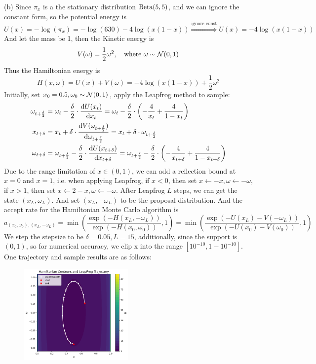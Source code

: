 \begin{homeworkProblem}
(b) Since $\pi_x$ is a the stationary distribution $\operatorname{Beta}(5,5)$, and we can ignore the constant form, so the potential energy is
$$U(x)=-\log(\pi_x) = -\log(630) -4\log(x(1-x)) \stackrel{\text{ignore const}}{\Rightarrow} U(x)=-4\log(x(1-x))$$
And let the mass be 1, then the Kinetic energy is
$$V(\omega)=\dfrac{1}{2}\omega^2, \quad\text{where } \omega\sim\mathcal{N}(0,1)$$
Thus the Hamiltonian energy is
$$H(x,\omega)=U(x)+V(\omega)=-4\log(x(1-x))+\dfrac{1}{2}\omega^2$$
Initially, set $x_0=0.5, \omega_0\sim\mathcal{N}(0,1)$, apply the Leapfrog method to sample:
\begin{align*}
\omega_{t+\frac{\delta}{2}} &= \omega_t - \frac{\delta}{2}\cdot \dfrac{\mathrm{d}U(x_t)}{\mathrm{d}x_t} = \omega_t - \frac{\delta}{2}\cdot \left(-\dfrac{4}{x_t}+\dfrac{4}{1-x_t}\right) \\
x_{t+\delta} &= x_t + \delta \cdot \dfrac{\mathrm{d}V(\omega_{t+\frac{\delta}{2}})}{\mathrm{d}\omega_{t+\frac{\delta}{2}}} = x_t + \delta\cdot \omega_{t+\frac{\delta}{2}} \\
\omega_{t+\delta} &= \omega_{t+\frac{\delta}{2}} - \frac{\delta}{2}\cdot \dfrac{\mathrm{d}U(x_{t+\delta})}{\mathrm{d}x_{t+\delta}} = \omega_{t+\frac{\delta}{2}} - \frac{\delta}{2}\cdot \left(-\dfrac{4}{x_{t+\delta}}+\dfrac{4}{1-x_{t+\delta}}\right)
\end{align*}
Due to the range limitation of $x\in(0,1)$, we can add a reflection bound at $x=0$ and $x=1$, i.e. when applying Leapfrog, if $x<0$, then set $x\gets -x, \omega\gets -\omega$, if $x>1$, then set $x\gets 2-x, \omega\gets -\omega$. After Leapfrog $L$ steps, we can get the state $(x_L, \omega_L)$. And set $(x_L, -\omega_L)$ to be the proposal distribution. And the accept rate for the Hamiltonian Monte Carlo algorithm is
$$a_{(x_0,\omega_0),(x_L,-\omega_L)}=\min\left(\dfrac{\exp\left(-H(x_L,-\omega_L)\right)}{\exp\left(-H(x_0,\omega_0)\right)}, 1\right)=\min\left(\dfrac{\exp\left(-U(x_L)-V(-\omega_L)\right)}{\exp\left(-U(x_0)-V(\omega_0)\right)}, 1\right)$$
We step the stepsize to be $\delta=0.05, L=15$, additionally, since the support is $(0,1)$, so for numerical accuracy, we clip x into the range $[10^{-10},1-10^{-10}]$. One trajectory and sample results are as follows:
\begin{figure}[h]
    \centering
    \includegraphics[width=0.5\textwidth]{./figure/p5/trajectory.png}

\end{figure}
\end{homeworkProblem}
